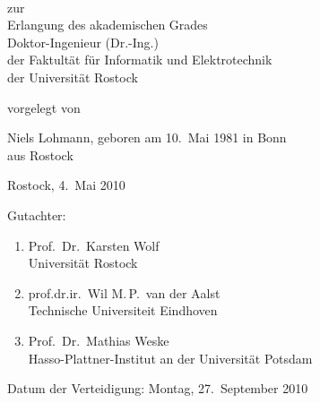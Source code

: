 \begin{center}
${}$
\vspace{3em}

\\\vspace{0.3em}

\vspace{3em}
\large
{}

\vspace{3em}

zur\\
Erlangung des akademischen Grades\\
Doktor-Ingenieur (Dr.-Ing.)\\
der Faktult\"at f\"ur Informatik und Elektrotechnik\\
der Universit\"at Rostock

\vspace{3em}

\noindent vorgelegt von\\\bigskip

\noindent Niels Lohmann, geboren am 10.\ Mai 1981 in Bonn\\
\noindent aus Rostock

\vspace{1em}

\noindent Rostock, 4.\ Mai 2010
\end{center}
\pagebreak
\thispagestyle{empty}


\noindent Gutachter:
\begin{enumerate}
\item Prof.\ Dr.\ Karsten Wolf\\Universit\"at Rostock

\item prof.dr.ir.\ Wil M.\,P.\, van der Aalst\\Technische Universiteit Eindhoven

\item Prof.\ Dr.\ Mathias Weske\\Hasso-Plattner-Institut an der Universit\"at Potsdam
\end{enumerate}

\vspace{3em}
\noindent Datum der Verteidigung: Montag, 27.\ September 2010%


\normalsize
\cleardoublepage
